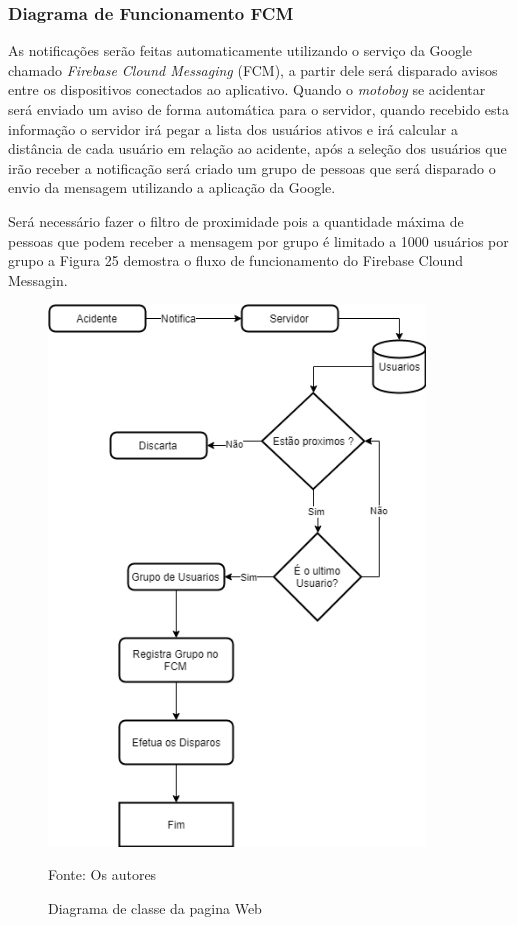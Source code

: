 \subsubsection{Diagrama de Funcionamento FCM}

As notificações serão feitas automaticamente utilizando o serviço da Google chamado \textit{Firebase Clound Messaging} (FCM), a partir dele será disparado avisos entre os dispositivos conectados ao aplicativo.
Quando o \textit{motoboy} se acidentar será enviado um aviso de forma automática para o servidor, quando recebido esta informação o servidor irá pegar a lista dos usuários ativos e irá calcular a distância de cada usuário em relação ao acidente, após a seleção dos usuários que irão receber a notificação será criado um grupo de pessoas que será disparado o envio da mensagem utilizando a aplicação da Google.

Será necessário fazer o filtro de proximidade pois a quantidade máxima de pessoas que podem receber a mensagem por grupo é limitado a 1000 usuários por grupo a Figura 25 demostra o fluxo de funcionamento do Firebase Clound Messagin.

    


\begin{figure}[H]

 \caption{Diagrama de classe da pagina Web}
 \begin{center}
  \includegraphics[width=100mm]{images/Cap3/Fluxo_Firebase.png}
  \end{center}
    Fonte: Os autores 
\end{figure}